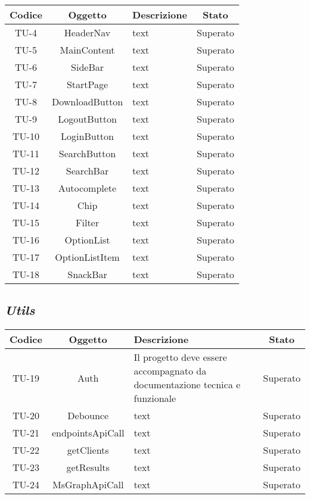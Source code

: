 \begin{center}
  \label{tab:test-unita-componenti}
  \begin{longtable}{|c|c|p{}|c|}
  \hline
  \textbf{Codice} & \textbf{Oggetto} & \textbf{Descrizione} & \textbf{Stato}\\
  \hline
  TU-4 &HeaderNav &text &Superato \\
  \hline
  TU-5 &MainContent &text &Superato \\
  \hline
  TU-6 &SideBar &text &Superato \\
  \hline
  TU-7 &StartPage &text &Superato \\
  \hline
  TU-8 &DownloadButton &text &Superato \\
  \hline
  TU-9 &LogoutButton &text &Superato \\
  \hline
  TU-10 &LoginButton &text &Superato \\
  \hline
  TU-11 &SearchButton &text &Superato \\
  \hline
  TU-12 &SearchBar &text &Superato \\
  \hline
  TU-13 &Autocomplete &text &Superato \\
  \hline
  TU-14 &Chip &text &Superato \\
  \hline
  TU-15 &Filter &text &Superato \\
  \hline
  TU-16 &OptionList &text &Superato \\
  \hline
  TU-17 &OptionListItem &text &Superato \\
  \hline
  TU-18 &SnackBar &text &Superato \\
  \hline
\end{longtable}
\end{center}

\subsection*{\emph{Utils}}


\begin{center}
  \label{tab:test-unita-utils}
  \begin{longtable}{|c|c|p{}|c|}
  \hline
  \textbf{Codice} & \textbf{Oggetto} & \textbf{Descrizione} & \textbf{Stato}\\
  \hline
  TU-19 &Auth &Il progetto deve essere accompagnato da documentazione tecnica e funzionale & Superato \\
  \hline
  TU-20 &Debounce &text &Superato \\
  \hline
  TU-21 &endpointsApiCall &text &Superato \\
  \hline
  TU-22 &getClients &text &Superato \\
  \hline
  TU-23 &getResults &text &Superato \\
  \hline
  TU-24 &MsGraphApiCall &text &Superato \\
  \hline
\end{longtable}
\end{center}



